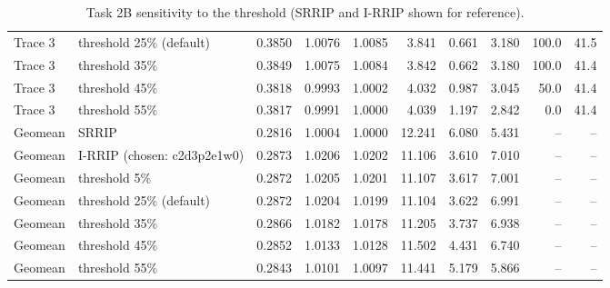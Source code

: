 \begin{table}[H]
{\begin{tabular}{llrrrrrrrr}
Trace 3 & threshold 25\% (default) & 0.3850 & 1.0076 & 1.0085 & 3.841 & 0.661 & 3.180 & 100.0 & 41.5 \\
Trace 3 & threshold 35\% & 0.3849 & 1.0075 & 1.0084 & 3.842 & 0.662 & 3.180 & 100.0 & 41.4 \\
Trace 3 & threshold 45\% & 0.3818 & 0.9993 & 1.0002 & 4.032 & 0.987 & 3.045 & 50.0 & 41.4 \\
Trace 3 & threshold 55\% & 0.3817 & 0.9991 & 1.0000 & 4.039 & 1.197 & 2.842 & 0.0 & 41.4 \\
\midrule
Geomean & SRRIP & 0.2816 & 1.0004 & 1.0000 & 12.241 & 6.080 & 5.431 & -- & -- \\
Geomean & I-RRIP (chosen: c2d3p2e1w0) & 0.2873 & 1.0206 & 1.0202 & 11.106 & 3.610 & 7.010 & -- & -- \\
Geomean & threshold 5\% & 0.2872 & 1.0205 & 1.0201 & 11.107 & 3.617 & 7.001 & -- & -- \\
Geomean & threshold 25\% (default) & 0.2872 & 1.0204 & 1.0199 & 11.104 & 3.622 & 6.991 & -- & -- \\
Geomean & threshold 35\% & 0.2866 & 1.0182 & 1.0178 & 11.205 & 3.737 & 6.938 & -- & -- \\
Geomean & threshold 45\% & 0.2852 & 1.0133 & 1.0128 & 11.502 & 4.431 & 6.740 & -- & -- \\
Geomean & threshold 55\% & 0.2843 & 1.0101 & 1.0097 & 11.441 & 5.179 & 5.866 & -- & -- \\
\bottomrule
\end{tabular}}
\ifdim\wd\fitbx>\linewidth\resizebox{\linewidth}{!}{\usebox{\fitbx}}\else\usebox{\fitbx}\fi
\caption{Task 2B sensitivity to the threshold (SRRIP and I-RRIP shown for reference).}\label{tab:t2b_thresh}
\end{table}

